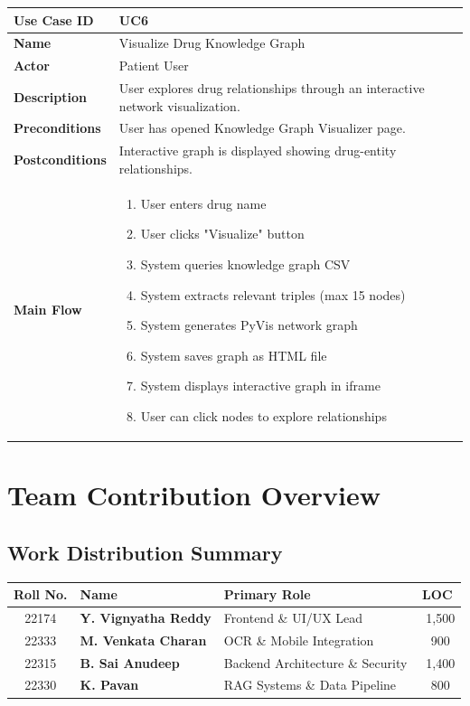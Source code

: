 \documentclass[12pt,a4paper]{report}
\begin{document}
\begin{tabularx}{\textwidth}{|l|X|}
\hline
\textbf{Use Case ID} & UC6 \\
\hline
\textbf{Name} & Visualize Drug Knowledge Graph \\
\hline
\textbf{Actor} & Patient User \\
\hline
\textbf{Description} & User explores drug relationships through an interactive network visualization. \\
\hline
\textbf{Preconditions} & User has opened Knowledge Graph Visualizer page. \\
\hline
\textbf{Postconditions} & Interactive graph is displayed showing drug-entity relationships. \\
\hline
\textbf{Main Flow} & 
\begin{enumerate}[nosep]
    \item User enters drug name
    \item User clicks "Visualize" button
    \item System queries knowledge graph CSV
    \item System extracts relevant triples (max 15 nodes)
    \item System generates PyVis network graph
    \item System saves graph as HTML file
    \item System displays interactive graph in iframe
    \item User can click nodes to explore relationships
\end{enumerate} \\
\hline
\end{tabularx}

\newpage

\chapter{Team Contribution Overview}

\section{Work Distribution Summary}

\begin{tabularx}{\textwidth}{|c|l|X|c|}
\hline
\textbf{Roll No.} & \textbf{Name} & \textbf{Primary Role} & \textbf{LOC} \\
\hline
22174 & \textcolor{primarycolor}{\textbf{Y. Vignyatha Reddy}} & Frontend \& UI/UX Lead & ~1,500 \\
\hline
22333 & \textcolor{secondarycolor}{\textbf{M. Venkata Charan}} & OCR \& Mobile Integration & ~900 \\
\hline
22315 & \textcolor{warningcolor}{\textbf{B. Sai Anudeep}} & Backend Architecture \& Security & ~1,400 \\
\hline
22330 & \textcolor{infocolor}{\textbf{K. Pavan}} & RAG Systems \& Data Pipeline & ~800 \\
\hline
\end{tabularx}
\end{document}
